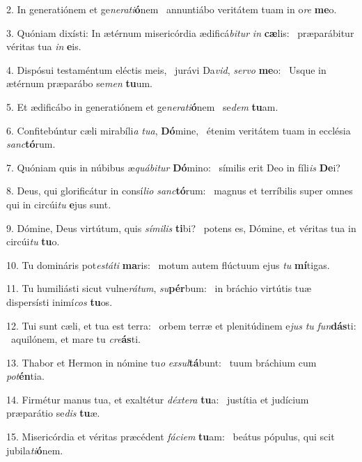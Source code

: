 2. In generatiónem et ge\textit{ne}\textit{ra}\textit{ti}\textbf{ó}nem \ast\  annuntiábo veritátem tuam in o\textit{re} \textbf{me}o.\

3. Quóniam dixísti: In ætérnum misericórdia ædificá\textit{bi}\textit{tur} \textit{in} \textbf{cæ}lis: \ast\  præparábitur véritas tua \textit{in} \textbf{e}is.\

4. Dispósui testaméntum eléctis meis, \dag\  jurávi Da\textit{vid}, \textit{ser}\textit{vo} \textbf{me}o: \ast\  Usque in ætérnum præparábo se\textit{men} \textbf{tu}um.\

5. Et ædificábo in generatiónem et ge\textit{ne}\textit{ra}\textit{ti}\textbf{ó}nem \ast\  se\textit{dem} \textbf{tu}am.\

6. Confitebúntur cæli mirabíli\textit{a} \textit{tu}\textit{a}, \textbf{Dó}mine, \ast\  étenim veritátem tuam in ecclésia \textit{sanc}\textbf{tó}rum.\

7. Quóniam quis in núbibus æ\textit{quá}\textit{bi}\textit{tur} \textbf{Dó}mino: \ast\  símilis erit Deo in fíli\textit{is} \textbf{De}i?\

8. Deus, qui glorificátur in consí\textit{li}\textit{o} \textit{sanc}\textbf{tó}rum: \ast\  magnus et terríbilis super omnes qui in circúi\textit{tu} \textbf{e}jus sunt.\

9. Dómine, Deus virtútum, quis \textit{sí}\textit{mi}\textit{lis} \textbf{ti}bi? \ast\  potens es, Dómine, et véritas tua in circúi\textit{tu} \textbf{tu}o.\

10. Tu domináris pot\textit{es}\textit{tá}\textit{ti} \textbf{ma}ris: \ast\  motum autem flúctuum ejus \textit{tu} \textbf{mí}tigas.\

11. Tu humiliásti sicut vulne\textit{rá}\textit{tum}, \textit{su}\textbf{pér}bum: \ast\  in bráchio virtútis tuæ dispersísti inimí\textit{cos} \textbf{tu}os.\

12. Tui sunt cæli, et tua est terra: \dag\  orbem terræ et plenitúdinem e\textit{jus} \textit{tu} \textit{fun}\textbf{dás}ti: \ast\  aquilónem, et mare tu \textit{cre}\textbf{ás}ti.\

13. Thabor et Hermon in nómine tu\textit{o} \textit{ex}\textit{sul}\textbf{tá}bunt: \ast\  tuum bráchium cum \textit{pot}\textbf{én}tia.\

14. Firmétur manus tua, et exaltétur \textit{déx}\textit{te}\textit{ra} \textbf{tu}a: \ast\  justítia et judícium præparátio se\textit{dis} \textbf{tu}æ.\

15. Misericórdia et véritas præcédent \textit{fá}\textit{ci}\textit{em} \textbf{tu}am: \ast\  beátus pópulus, qui scit jubila\textit{ti}\textbf{ó}nem.\

